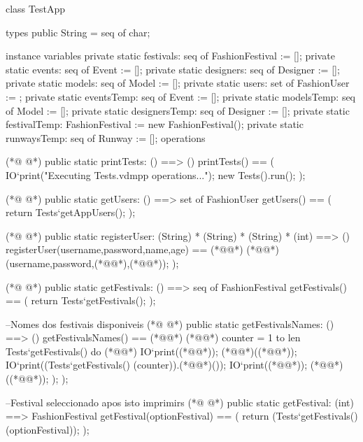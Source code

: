 \begin{vdmpp}[breaklines=true]
class TestApp

types
public String = seq of char;

instance variables
private  static festivals: seq of FashionFestival := [];
private  static events: seq of Event := [];
private  static designers: seq of Designer := [];
private  static models: seq of Model := [];
private  static users: set of FashionUser := {};
private  static eventsTemp: seq of Event := [];
private  static modelsTemp: seq of Model := [];
private  static designersTemp: seq of Designer := [];
private  static festivalTemp: FashionFestival := new FashionFestival();
private  static runwaysTemp: seq of Runway := [];
operations

(*@
\label{printTests:19}
@*)
public static printTests: () ==> ()
 printTests() == 
 (
  IO`print("Executing Tests.vdmpp operations...");
    new Tests().run();   
   );
   
   
(*@
\label{getUsers:27}
@*)
 public static getUsers: () ==> set of FashionUser
 getUsers() ==
 ( 
 return Tests`getAppUsers();
 );
 
(*@
\label{registerUser:33}
@*)
  public static registerUser: (String) *  (String) * (String) * (int) ==> ()
  registerUser(username,password,name,age) == 
  (*@\vdmnotcovered{(}@*)
   (*@@*)(username,password,(*@@*),(*@@*));
  );
  
  
  
  
(*@
\label{getFestivals:42}
@*)
  public static getFestivals: () ==> seq of FashionFestival
  getFestivals() ==
  (
   return Tests`getFestivals();
  );
   
  --Nomes dos festivais disponiveis
(*@
\label{getFestivalsNames:49}
@*)
  public static getFestivalsNames: () ==> ()
 getFestivalsNames() ==
 (*@\vdmnotcovered{(}@*) 
 (*@@*) counter = 1 to len Tests`getFestivals() do (*@\vdmnotcovered{(}@*)
    IO`print((*@@*));
    (*@@*)((*@@*));
    IO`print((Tests`getFestivals() (counter)).(*@@*)());
    IO`print((*@@*));
    (*@@*)((*@@*));
   );
  );   
  
  --Festival seleccionado apos isto imprimirs
(*@
\label{getFestival:62}
@*)
  public static getFestival: (int) ==> FashionFestival
  getFestival(optionFestival) ==
  ( 
  return (Tests`getFestivals() (optionFestival));
  );
  

\end{vdmpp}
